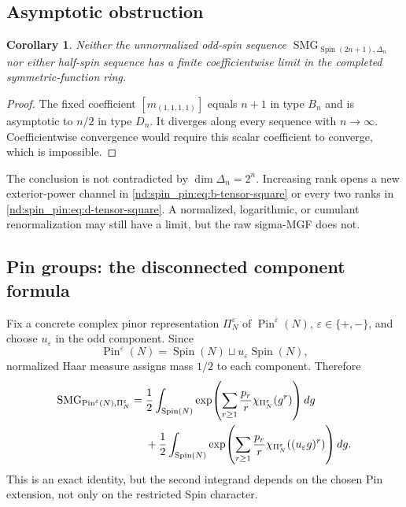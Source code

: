 \documentclass[10pt]{article}
\newcommand{\SMG}{\operatorname{SMG}}
\newcommand{\MGF}{\SMG}
\newtheorem{corollary}{Corollary}
\begin{document}
\subsection{Asymptotic obstruction}

\begin{corollary}\label{nd:spin_pin:cor:no-limit}
Neither the unnormalized odd-spin sequence
$\MGF_{\operatorname{Spin}(2n+1),\Delta_n}$ nor either half-spin sequence has
a finite coefficientwise limit in the completed symmetric-function ring.
\end{corollary}

\begin{proof}
The fixed coefficient $[m_{(1,1,1,1)}]$ equals $n+1$ in type $B_n$ and is
asymptotic to $n/2$ in type $D_n$.  It diverges along every sequence with
$n\to\infty$.  Coefficientwise convergence would require this scalar
coefficient to converge, which is impossible.
\end{proof}

The conclusion is not contradicted by $\dim\Delta_n=2^n$.  Increasing rank
opens a new exterior-power channel in \eqref{nd:spin_pin:eq:b-tensor-square} or every two
ranks in \eqref{nd:spin_pin:eq:d-tensor-square}.  A normalized, logarithmic, or cumulant
renormalization may still have a limit, but the raw sigma-MGF does not.

\subsection{Pin groups: the disconnected component formula}

Fix a concrete complex pinor representation $\Pi_N^\varepsilon$ of
$\operatorname{Pin}^\varepsilon(N)$, $\varepsilon\in\{+,-\}$, and choose
$u_\varepsilon$ in the odd component.  Since
\[
 \operatorname{Pin}^\varepsilon(N)
 =\operatorname{Spin}(N)\sqcup
 u_\varepsilon\operatorname{Spin}(N),
\]
normalized Haar measure assigns mass $1/2$ to each component.  Therefore
\begin{align}\label{nd:spin_pin:eq:pin-components}
 \MGF_{\operatorname{Pin}^\varepsilon(N),\Pi_N^\varepsilon}
 ={}&\frac12\int_{\operatorname{Spin}(N)}
 \exp\!\left(\sum_{r\ge1}\frac{p_r}{r}
 \chi_{\Pi_N^\varepsilon}(g^r)\right)dg\\
 &+\frac12\int_{\operatorname{Spin}(N)}
 \exp\!\left(\sum_{r\ge1}\frac{p_r}{r}
 \chi_{\Pi_N^\varepsilon}((u_\varepsilon g)^r)\right)dg.\notag
\end{align}
This is an exact identity, but the second integrand depends on the chosen Pin
extension, not only on the restricted Spin character.
\end{document}
